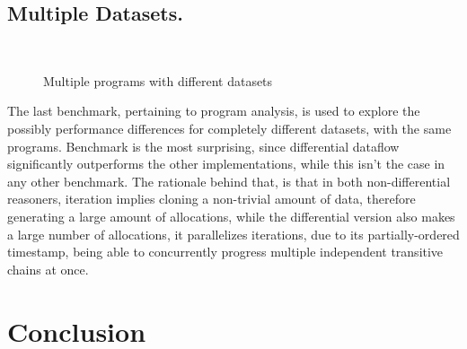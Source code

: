 \documentclass[sigconf,screen,review,natbib]{acmart}
\theoremstyle{definition}
\begin{document}
\subsection{Multiple Datasets.}

\begin{figure}[ht]
	\centering
	\\
	\caption{Multiple programs with different datasets}
	\label{benchmark:scalability}
\end{figure}

The last benchmark, pertaining to program analysis, is used to explore the possibly performance differences for completely different datasets, with the same programs. Benchmark \cite{benchmark:csda} is the most surprising, since differential dataflow significantly outperforms the other implementations, while this isn't the case in any other benchmark. The rationale behind that, is that in both non-differential reasoners, iteration implies cloning a non-trivial amount of data, therefore generating a large amount of allocations, while the differential version also makes a large number of allocations, it parallelizes iterations, due to its partially-ordered timestamp, being able to concurrently progress multiple independent transitive chains at once.

\section{Conclusion}
\end{document}
